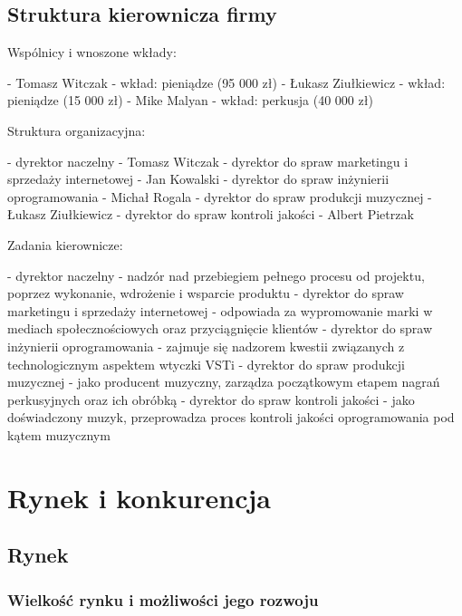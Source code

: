\documentclass[12pt]{article}
\begin{document}

\subsection{Struktura kierownicza firmy}

Wspólnicy i wnoszone wkłady:

- Tomasz Witczak - wkład: pieniądze (95 000 zł)
- Łukasz Ziułkiewicz - wkład: pieniądze (15 000 zł)
- Mike Malyan - wkład: perkusja (40 000 zł)

Struktura organizacyjna:

- dyrektor naczelny - Tomasz Witczak
- dyrektor do spraw marketingu i sprzedaży internetowej - Jan Kowalski
- dyrektor do spraw inżynierii oprogramowania - Michał Rogala
- dyrektor do spraw produkcji muzycznej - Łukasz Ziułkiewicz
- dyrektor do spraw kontroli jakości - Albert Pietrzak

Zadania kierownicze:

- dyrektor naczelny - nadzór nad przebiegiem pełnego procesu od projektu,
  poprzez wykonanie, wdrożenie i wsparcie produktu
- dyrektor do spraw marketingu i sprzedaży internetowej - odpowiada za
  wypromowanie marki w mediach społecznościowych oraz przyciągnięcie klientów
- dyrektor do spraw inżynierii oprogramowania - zajmuje się nadzorem kwestii
  związanych z technologicznym aspektem wtyczki VSTi
- dyrektor do spraw produkcji muzycznej - jako producent muzyczny, zarządza
  początkowym etapem nagrań perkusyjnych oraz ich obróbką
- dyrektor do spraw kontroli jakości - jako doświadczony muzyk, przeprowadza
  proces kontroli jakości oprogramowania pod kątem muzycznym

\section{Rynek i konkurencja}

\subsection{Rynek}

\subsubsection{Wielkość rynku i możliwości jego rozwoju}
\end{document}
